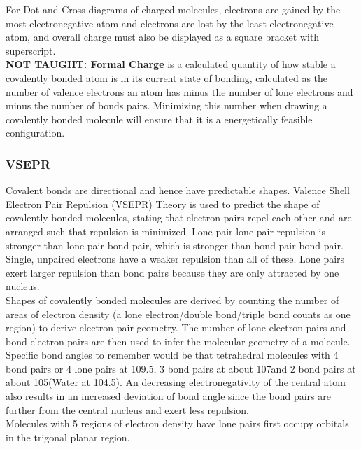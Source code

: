 \documentclass[../main]{subfiles}
\begin{document}
	For Dot and Cross diagrams of charged molecules, electrons are gained by the most electronegative atom and electrons are lost by the least electronegative atom, and overall charge must also be displayed as a square bracket with superscript. \\

	\textbf{NOT TAUGHT: Formal Charge} is a calculated quantity of how stable a covalently bonded atom is in its current state of bonding, calculated as the number of valence electrons an atom has minus the number of lone electrons and minus the number of bonds pairs. Minimizing this number when drawing a covalently bonded molecule will ensure that it is a energetically feasible configuration.

	\subsubsection{VSEPR}

	Covalent bonds are directional and hence have predictable shapes. Valence Shell Electron Pair Repulsion (VSEPR) Theory is used to predict the shape of covalently bonded molecules, stating that electron pairs repel each other and are arranged such that repulsion is minimized. Lone pair-lone pair repulsion is stronger than lone pair-bond pair, which is stronger than bond pair-bond pair. Single, unpaired electrons have a weaker repulsion than all of these. Lone pairs exert larger repulsion than bond pairs because they are only attracted by one nucleus. \\

	Shapes of covalently bonded molecules are derived by counting the number of areas of electron density (a lone electron/double bond/triple bond counts as one region) to derive electron-pair geometry. The number of lone electron pairs and bond electron pairs are then used to infer the molecular geometry of a molecule. \\

	Specific bond angles to remember would be that tetrahedral molecules with 4 bond pairs or 4 lone pairs at 109.5\degree, 3 bond pairs at about 107\degree and 2 bond pairs at about 105\degree (Water at 104.5\degree). An decreasing electronegativity of the central atom also results in an increased deviation of bond angle since the bond pairs are further from the central nucleus and exert less repulsion. \\

	Molecules with 5 regions of electron density have lone pairs first occupy orbitals in the trigonal planar region. \\
\end{document}
